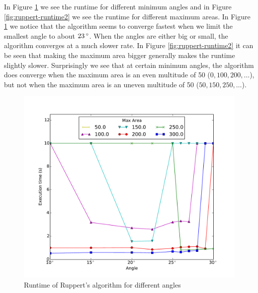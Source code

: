 In Figure \ref{fig:ruppert-runtime} we see the runtime for different minimum angles and in Figure \ref{fig:ruppert-runtime2} we see the runtime for different maximum areas.
In Figure \ref{fig:ruppert-runtime} we notice that the algorithm seems to converge fastest when we limit the smallest angle to about $23\,^{\circ}$.
When the angles are either big or small, the algorithm converges at a much slower rate.
In Figure \ref{fig:ruppert-runtime2} it can be seen that making the maximum area bigger generally makes the runtime slightly slower.
Surprisingly we see that at certain minimum angles, the algorithm does converge when the maximum area is an even multitude of 50 ($0, 100, 200, \ldots$), but not when the maximum area is an uneven multitude of 50 ($50, 150, 250, \ldots$).

\begin{figure}[ht]
    \centering
    \includegraphics[width=\columnwidth]{../images/ruppert.pdf}
    \caption{Runtime of Ruppert's algorithm for different angles}
    \label{fig:ruppert-runtime}
\end{figure}

